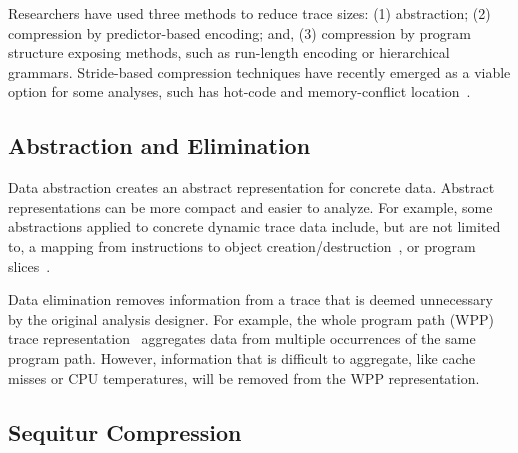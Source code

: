 \documentclass[defaultstyle,11pt]{thesis}
\begin{document}
Researchers have used three methods to reduce trace sizes: (1)
abstraction; (2) compression by predictor-based encoding; and, (3)
compression by program structure exposing methods, such as run-length
encoding or hierarchical grammars.  Stride-based compression
techniques have recently emerged as a viable option for some analyses,
such has hot-code and memory-conflict
location~\cite{minjang:10:micro}.

\subsection{Abstraction and Elimination}

Data abstraction creates an abstract representation for concrete data.
Abstract representations can be more compact and easier to analyze.
For example, some abstractions applied to concrete dynamic trace data
include, but are not limited to, a mapping from instructions to object
creation/destruction~\cite{sridharan:07:pldi}, or program
slices~\cite{zhang:04:icse}.

Data elimination removes information from a trace that is deemed
unnecessary by the original analysis designer.  For example, the whole
program path (WPP) trace representation~\cite{larus:99:pldi}
aggregates data from multiple occurrences of the same program
path.  However, information that is difficult to aggregate, like cache
misses or CPU temperatures, will be removed from the WPP
representation.

\subsection{Sequitur Compression}
\end{document}
